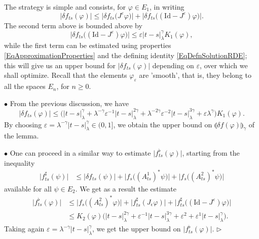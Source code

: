 \documentclass[11pt,a4paper]{amsart}
\renewcommand{\leq}{\leqslant}
\renewcommand{\geq}{\geqslant}
\newcommand{\ssk}{\smallskip}
\numberwithin{equation}{section} %
\newenvironment{Dem}{%
    \begin{list}{\hspace{0.5cm}{\sc Proof --}}{%
        \setlength{\topsep}{0pt}%
        \setlength{\leftmargin}{0pt}%
        \setlength{\rightmargin}{0pt}%
        \setlength{\listparindent}{0pt}%
        \setlength{\itemindent}{0pt}%
        \setlength{\parsep}{0pt}%
        \addtolength{\leftmargin}{20pt}%
        \addtolength{\rightmargin}{0pt}%
    } \item }{\hfill{\space $\rhd$}\end{list}\smallskip}
\begin{document}
\begin{Dem}
The strategy is simple and consists, for $\varphi\in E_1$, in writing
$$
\big|\delta f_{ts}(\varphi)\big| \leq \Big|\delta f_{ts}\big( J^\varepsilon\varphi\big)\Big| + \Big|\delta f_{ts}\big((\textrm{Id} - J^\varepsilon)\varphi\big)\Big|.
$$
The second term above is bounded above by 
$$
\Big|\delta f_{ts}\big((\textrm{Id} - J^\varepsilon)\varphi\big)\Big| \leq \varepsilon |t-s|_\lambda^\gamma K_1(\varphi),
$$ 
while the first term can be estimated using properties \eqref{EqApproximationProperties} and the defining identity \eqref{EqDefnSolutionRDE}; this will give us an upper bound for $\big|\delta f_{ts}(\varphi)\big|$ depending on $\varepsilon$, over which we shall optimize. Recall that the elements $\varphi_\varepsilon$  are 'smooth', that is, they belong to all the spaces $E_n$, for $n\geq 0$.

\medskip

$\bullet$ From the previous discussion, we have
\begin{equation*}
\Big| \delta f_{ts} (\varphi) \Big| \leq \Big(|t-s|^\gamma_\lambda + \lambda^{-\gamma}\varepsilon^{-1}|t-s|^{2\gamma}_\lambda  + \lambda^{-2\gamma} \varepsilon^{-2}|t-s|^{3\gamma}_\lambda  + \varepsilon\lambda^{\gamma}\Big) K_1(\varphi).
\end{equation*}
By choosing $\varepsilon = \lambda^{-\gamma} | t - s |_\lambda^\gamma \in(0,1]$, we obtain the upper bound on $\llparenthesis \delta f(\varphi) \rrparenthesis_\gamma$ of the lemma.

\ssk

$\bullet$ One can proceed in a similar way to estimate $\big|f^\flat_{ts}(\varphi)\big|$, starting from the inequality
\begin{equation*}
\begin{split}
\big| f^\sharp_{ts}(\psi)\big| &\leq \big| \delta f_{ts}(\psi)\big| + \Big| f_s\big((A^1_{ts})^*\psi\big)\Big| + \Big| f_s\big((A^2_{ts})^*\psi\big)\Big| 
\end{split}
\end{equation*}
available for all $\psi\in E_2$. We get as a result the estimate
\begin{equation*}
\begin{split}
\big| f^\flat_{ts} (\varphi) \big| &\leq \Big| f_s\big((A^2_{ts})^*\varphi\big)\Big| + \Big|f^\sharp_{ts}(J_\epsilon \varphi)\Big| + \Big|f^\sharp_{ts}\big((\textrm{Id} - J^\varepsilon)\varphi\big)\Big|  \\
&\leq K_2(\varphi) \Big(|t-s|_\lambda^{2\gamma} + \varepsilon^{-1}|t-s|_\lambda^{3\gamma}+ \varepsilon^{2} +  \varepsilon^{1}|t-s|_\lambda^{\gamma}\Big).
\end{split}
\end{equation*}
Taking again $\varepsilon = \lambda^{-\gamma} |t-s|^\gamma_\lambda$, we get the upper bound on $\big|f^\flat_{ts}(\varphi)\big|$.
\end{Dem}
\end{document}
